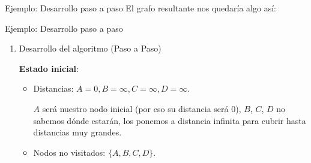 \documentclass{beamer}
\begin{document}
    \begin{frame}{Ejemplo: Desarrollo paso a paso}
        El grafo resultante nos quedaría algo así: 

        \begin{center}
        \end{center}
    \end{frame}

    \begin{frame}{Ejemplo: Desarrollo paso a paso}
        \begin{enumerate}
            \item Desarrollo del algoritmo (Paso a Paso)

            \vspace{0.25cm}

            \textbf{Estado inicial}:
            
            \vspace{0.25cm}

            \begin{itemize}
                \item Distancias: $A = 0, B = \infty, C = \infty, D = \infty$.

                \vspace{0.25cm}

                $A$ será nuestro nodo inicial (por eso su distancia será 0), $B$, $C$, $D$ no sabemos dónde estarán, los ponemos a distancia infinita para cubrir hasta distancias muy grandes.

                \vspace{0.25cm}

                \item Nodos no visitados: $\{A, B, C, D\}$.
            \end{itemize}
        \end{enumerate}
    \end{frame}
\end{document}
